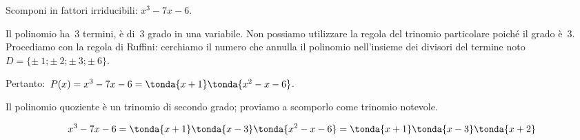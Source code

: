 \begin{esempio}{}{}
Scomponi in fattori irriducibili: \(x^3-7x-6\).

Il polinomio ha~3 termini, è di~3{\textdegree} grado in una variabile.
Non possiamo utilizzare la regola del trinomio particolare poiché il
grado è~3. Procediamo con la regola di Ruffini: cerchiamo il numero che 
annulla 
il polinomio nell'insieme dei divisori del termine
noto~\(D=\{\pm~1;\pm~2;\pm~3;\pm~6\}\).


Pertanto:~\(P(x)=x^3-7x-6=\tonda{x+1} \tonda{x^2-x-6}\).

Il polinomio quoziente è un trinomio di secondo grado; proviamo a
scomporlo come trinomio notevole.

\vspace{-1em}
\[x^{{3}}-7x-6 = 
\tonda{x+1} \tonda{x-3} \tonda{x^2-x-6} = 
\tonda{x+1} \tonda{x-3} \tonda{x+2}\]
\end{esempio}
%  
% 
% 
% 
% 
% 
% 
% 
